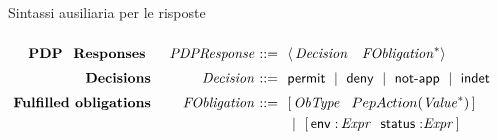 \begin{table}[!t]
\small
\caption{Sintassi ausiliaria per le risposte}
$
\begin{array}{@{\ }r@{\ \ \ \ }r@{\ }r@{\ \ }l@{\ }}

&&&\\[-.2cm]
{\textbf{PDP \ Responses }} &
\mathit{PDPResponse} & ::= & \langle \,\mathit{Decision} \ \ \ \mathit{FObligation}^* \rangle
\\[.2cm]
{\textbf{Decisions}} &
\mathit{Decision} & ::= & \permit \Sep \deny \Sep \notApp \Sep \indet
\\[.2cm]
{\textbf{Fulfilled obligations}} &
\mathit{FObligation} & ::= &  [ \, \mathit{ObType} \ \ \obl{\mathit{Value}} \, ]\\[.1cm]
&& & \Sep [ \, \x{env:} \, \mathit{Expr}\ \  \x{status:}\mathit{Expr}\, ]

\end{array}
$
\label{tab:facpl_new_context_syntax}
\end{table}
